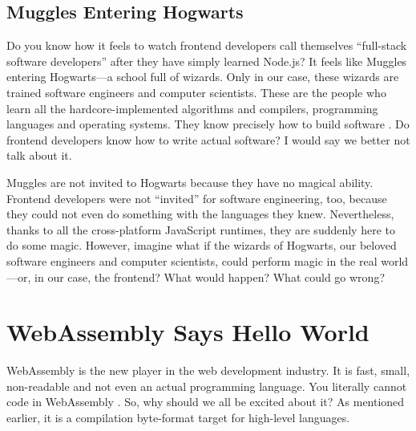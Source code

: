 \documentclass[10pt]{article}
\begin{document}
\begin{sloppypar}
  \subsection{Muggles Entering Hogwarts}
  \label{sec:muggles}

  Do you know how it feels to watch frontend developers call themselves “full-stack software developers” after they have simply learned Node.js? It feels like Muggles entering Hogwarts—a school full of wizards. Only in our case, these wizards are trained software engineers and computer scientists. These are the people who learn all the hardcore-implemented algorithms and compilers, programming languages and operating systems. They know precisely how to build software \citep{might_what_2011}. Do frontend developers know how to write actual software? I would say we better not talk about it.

  Muggles are not invited to Hogwarts because they have no magical ability. Frontend developers were not “invited” for software engineering, too, because they could not even do something with the languages they knew. Nevertheless, thanks to all the cross-platform JavaScript runtimes, they are suddenly here to do some magic. However, imagine what if the wizards of Hogwarts, our beloved software engineers and computer scientists, could perform magic in the real world—or, in our case, the frontend? What would happen? What could go wrong?

  \section{WebAssembly Says Hello World}
  \label{sec:hello-world}

  WebAssembly is the new player in the web development industry. It is fast, small, non-readable and not even an actual programming language. You literally cannot code in WebAssembly \citep{rourke_learn_2018}. So, why should we all be excited about it? As mentioned earlier, it is a compilation byte-format target for high-level languages.

  \begin{figure}[ht]
    \centering
    \label{fig:wasm}
  \end{figure}


\end{sloppypar}
\end{document}
